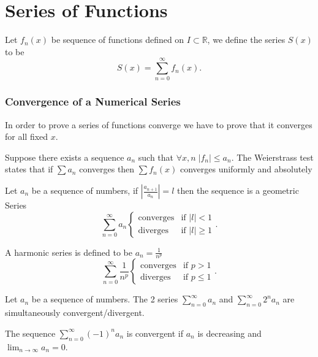 \part{Series of Functions}

\begin{definition}
	Let $f_n(x)$ be sequence of functions defined on $I\subset\mathbb{R}$, we define the series $S(x)$ to be
	\[
		S(x)=\sum_{n=0}^{\infty} f_n(x)
		.\]
\end{definition}

\section{Convergence of a Numerical Series}
In order to prove a series of functions converge we have to prove that it converges for all fixed $x$.
\begin{theorem}
	Suppose there exists a sequence $a_n$ such that $\forall x,n \; |f_n|\le a_n$. The Weierstrass test states that if $\sum a_n$ converges then $\sum f_n(x)$ converges uniformly and absolutely
\end{theorem}

\begin{theorem}
	Let $a_n$ be a sequence of numbers, if $\left| \frac{a_{n+1}}{a_n} \right| =l$ then the sequence is a geometric Series
	\[
		\sum_{n=0}^\infty a_n \begin{cases} \text{converges} & \text{if } |l|<1   \\
			\text{diverges}  & \text{if }|l|\ge 1\end{cases}
		.\]
\end{theorem}

\begin{theorem}
	A harmonic series is defined to be $a_n=\frac{1}{n^p}$
	\[
		\sum_{n=0}^\infty \frac{1}{n^p} \begin{cases} \text{converges} & \text{if } p>1   \\
			\text{diverges}  & \text{if }p\le 1\end{cases}
		.\]

\end{theorem}


\begin{theorem}
	Let $a_n$ be a sequence of numbers. The 2 series $\sum_{n=0}^{\infty} a_n$ and $\sum_{n=0}^{\infty} 2^na_n$ are simultaneously convergent/divergent.
\end{theorem}


\begin{theorem}
	The sequence $\sum_{n=0}^{\infty} (-1)^na_n$ is convergent if $a_n$ is decreasing and $\lim_{n \to \infty}a_n =0$.
\end{theorem}

